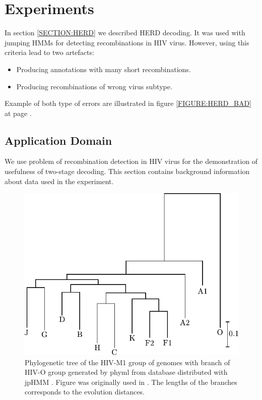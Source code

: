\section{Experiments}

In section \ref{SECTION:HERD} we described HERD decoding. It was used with
jumping HMMs \cite{Schultz2006} for detecting recombinations in HIV virus.
However, using this criteria lead to two artefacts: \begin{itemize} \item
Producing annotations with many short recombinations.  \item Producing
recombinations of wrong virus subtype.  \end{itemize} Example of both type of
errors are illustrated in figure \ref{FIGURE:HERD_BAD} at page
\pageref{FIGURE:HERD_BAD}.

\subsection{Application Domain}
We use problem of recombination detection in HIV virus for the demonstration of
usefulness of two-stage decoding.  This section contains background information
about data used in the experiment.

\begin{figure}
\begin{center}
\includegraphics{../figures/hiv_M1strom}
\end{center}
\caption[Phylogenetic tree of the HIV-M1 group]{Phylogenetic tree of the HIV-M1
group of genomes with branch of HIV-O group generated by phyml \cite{Guidon2003}
from database distributed with jpHMM \cite{Schultz2006}. Figure was originally
used in \cite{Nanasi2010mgr}. The lengths of the branches corresponds to the
evolution distances.  }\label{app:figure:phil}
\end{figure}

